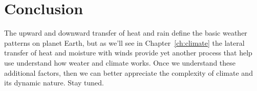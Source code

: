 \section{Conclusion}

The upward and downward transfer of heat and rain define the basic weather patterns on planet Earth, but as we'll see in Chapter~\ref{ch:climate} the lateral transfer of heat and moisture with winds provide yet another process that help use understand how weater and climate works. Once we understand these additional factors, then we can better appreciate the complexity of climate and its dynamic nature.  Stay tuned.